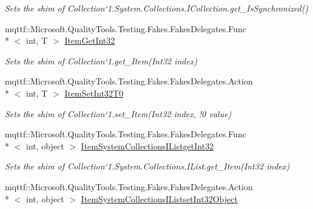 \begin{DoxyCompactItemize}
\begin{DoxyCompactList}\small\item\em Sets the shim of Collection`1.System.\-Collections.\-I\-Collection.\-get\-\_\-\-Is\-Synchronized()\end{DoxyCompactList}\item 
mqttf\-::\-Microsoft.\-Quality\-Tools.\-Testing.\-Fakes.\-Fakes\-Delegates.\-Func\\*
$<$ int, T $>$ \hyperlink{class_system_1_1_collections_1_1_object_model_1_1_fakes_1_1_shim_collection_3_01_t_01_4_a348e49baf6d4899c68e67aab49604bf5}{Item\-Get\-Int32}
\begin{DoxyCompactList}\small\item\em Sets the shim of Collection`1.get\-\_\-\-Item(\-Int32 index)\end{DoxyCompactList}\item 
mqttf\-::\-Microsoft.\-Quality\-Tools.\-Testing.\-Fakes.\-Fakes\-Delegates.\-Action\\*
$<$ int, T $>$ \hyperlink{class_system_1_1_collections_1_1_object_model_1_1_fakes_1_1_shim_collection_3_01_t_01_4_a64d9c243169100ebaba5a98297ea484f}{Item\-Set\-Int32\-T0}
\begin{DoxyCompactList}\small\item\em Sets the shim of Collection`1.set\-\_\-\-Item(Int32 index, !0 value)\end{DoxyCompactList}\item 
mqttf\-::\-Microsoft.\-Quality\-Tools.\-Testing.\-Fakes.\-Fakes\-Delegates.\-Func\\*
$<$ int, object $>$ \hyperlink{class_system_1_1_collections_1_1_object_model_1_1_fakes_1_1_shim_collection_3_01_t_01_4_a7e80f6b95faad0153527a489dc47e7f7}{Item\-System\-Collections\-I\-Listget\-Int32}
\begin{DoxyCompactList}\small\item\em Sets the shim of Collection`1.System.\-Collections.\-I\-List.\-get\-\_\-\-Item(\-Int32 index)\end{DoxyCompactList}\item 
mqttf\-::\-Microsoft.\-Quality\-Tools.\-Testing.\-Fakes.\-Fakes\-Delegates.\-Action\\*
$<$ int, object $>$ \hyperlink{class_system_1_1_collections_1_1_object_model_1_1_fakes_1_1_shim_collection_3_01_t_01_4_a98c47d083602f6abf7a1bdd24acaa5ae}{Item\-System\-Collections\-I\-Listset\-Int32\-Object}

\end{DoxyCompactItemize}
